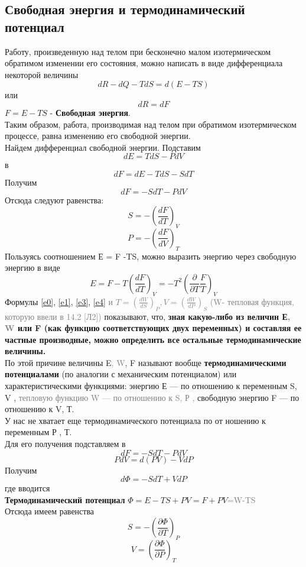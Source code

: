 \subsection{Свободная энергия и термодинамический потенциал}
Работу, произведенную над телом при бесконечно малом
изотермическом обратимом изменении его состояния, можно
написать в виде дифференциала некоторой величины
$$
dR-dQ-TdS=d(E-TS)
$$
или 
$$
dR=dF
$$
 $F = E-TS$ - \textbf{Свободная энергия}.\\
Таким образом, работа, производимая над телом при
обратимом изотермическом процессе, равна изменению его сво­бодной энергии. \\
Найдем дифференциал свободной энергии.
Подставим
$$
dE = TdS - PdV
$$
в
$$
dF=  dE - TdS - SdT
$$
Получим 
$$
dF = -SdT-PdV
$$
Отсюда следуют равенства:
\begin{equation}\label{e3}
S = - (\frac{dF}{dT})_V
\end{equation}
\begin{equation}\label{e4}
P = - (\frac{dF}{dV})_T
\end{equation}
Пользуясь соотношением Е = F -TS, можно выразить энергию
через свободную энергию в виде
$$
E = F - T (\frac{dF}{dT})_V = -T^2(\frac{\partial}{\partial T}\frac{F}{T})_V
$$
Формулы \ref{e0}, \ref{e1}, \ref{e3}, \ref{e4} \textcolor{gray}{и $ T = (\frac{dW}{dS})_P, V = (\frac{dW}{dP})_S$ (W- тепловая функция, которую ввели в 14.2 [Л2])} показывают, что, \textbf{зная какую-либо из величин Е\textcolor{gray}{, W} или F (как функцию соответствую­щих двух переменных) и составляя ее частные производные, можно определить все остальные термодинамические величины.}\\
По этой причине величины E\textcolor{gray}{, W}, F называют вообще \textbf{термо­динамическими потенциалами} (по аналогии с механическим по­тенциалом) или характеристическими функциями: энергию Е —
по отношению к переменным S, V , \textcolor{gray}{тепловую функцию W —
по отношению к S, Р ,} свободную энергию F — по отношению
к V, Т.\\
У нас не хватает еще термодинамического потенциала по от­
ношению к переменным Р , Т.\\
Для его получения подставляем в
$$
dF = -SdT-PdV
$$
$$
PdV = d(PV) - VdP
$$
Получим 
$$
d\Phi = -SdT+VdP
$$
где вводится \\
\textbf{Термодинамический потенциал} $\Phi = E - TS +PV=F+PV$\textcolor{gray}{=W-TS}\\
Отсюда имеем равенства
$$
S = -(\frac{\partial\Phi}{\partial T})_P
$$
$$
V = (\frac{\partial\Phi}{\partial P})_T
$$

